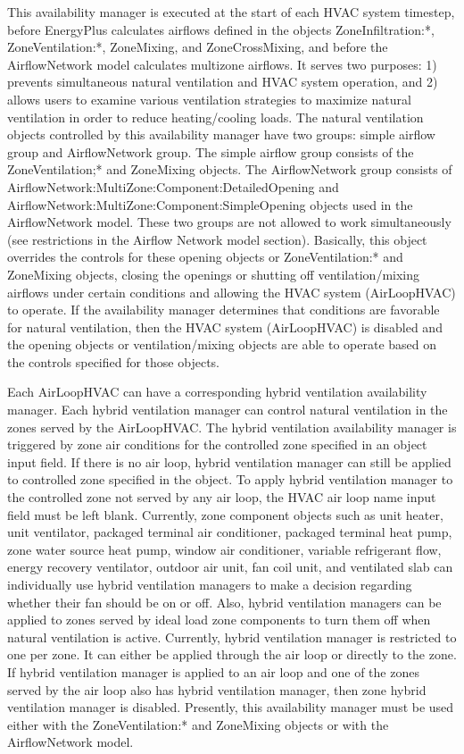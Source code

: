 This availability manager is executed at the start of each HVAC system timestep, before EnergyPlus calculates airflows defined in the objects ZoneInfiltration:*, ZoneVentilation:*, ZoneMixing, and ZoneCrossMixing, and before the AirflowNetwork model calculates multizone airflows. It serves two purposes: 1) prevents simultaneous natural ventilation and HVAC system operation, and 2) allows users to examine various ventilation strategies to maximize natural ventilation in order to reduce heating/cooling loads. The natural ventilation objects controlled by this availability manager have two groups: simple airflow group and AirflowNetwork group. The simple airflow group consists of the ZoneVentilation;* and ZoneMixing objects. The AirflowNetwork group consists of AirflowNetwork:MultiZone:Component:DetailedOpening and AirflowNetwork:MultiZone:Component:SimpleOpening objects used in the AirflowNetwork model. These two groups are not allowed to work simultaneously (see restrictions in the Airflow Network model section). Basically, this object overrides the controls for these opening objects or ZoneVentilation:* and ZoneMixing objects, closing the openings or shutting off ventilation/mixing airflows under certain conditions and allowing the HVAC system (AirLoopHVAC) to operate. If the availability manager determines that conditions are favorable for natural ventilation, then the HVAC system (AirLoopHVAC) is disabled and the opening objects or ventilation/mixing objects are able to operate based on the controls specified for those objects.

Each AirLoopHVAC can have a corresponding hybrid ventilation availability manager. Each hybrid ventilation manager can control natural ventilation in the zones served by the AirLoopHVAC. The hybrid ventilation availability manager is triggered by zone air conditions for the controlled zone specified in an object input field. If there is no air loop, hybrid ventilation manager can still be applied to controlled zone specified in the object. To apply hybrid ventilation manager to the controlled zone not served by any air loop, the HVAC air loop name input field must be left blank. Currently, zone component objects such as unit heater, unit ventilator, packaged terminal air conditioner, packaged terminal heat pump, zone water source heat pump, window air conditioner, variable refrigerant flow, energy recovery ventilator, outdoor air unit, fan coil unit, and ventilated slab can individually use hybrid ventilation managers to make a decision regarding whether their fan should be on or off. Also, hybrid ventilation managers can be applied to zones served by ideal load zone components to turn them off when natural ventilation is active. Currently, hybrid ventilation manager is restricted to one per zone. It can either be applied through the air loop or directly to the zone. If hybrid ventilation manager is applied to an air loop and one of the zones served by the air loop also has hybrid ventilation manager, then zone hybrid ventilation manager is disabled. Presently, this availability manager must be used either with the ZoneVentilation:* and ZoneMixing objects or with the AirflowNetwork model.

